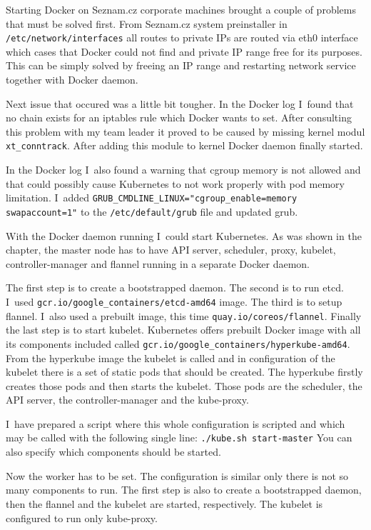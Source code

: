 Starting Docker on Seznam.cz corporate machines brought a couple of problems that must be solved first. From Seznam.cz system preinstaller in \lstinline{/etc/network/interfaces} all routes to private IPs are routed via eth0 interface which cases that Docker could not find and private IP range free for its purposes. This can be simply solved by freeing an IP range and restarting network service together with Docker daemon.

Next issue that occured was a little bit tougher. In the Docker log I~found that no chain exists for an iptables rule which Docker wants to set. After consulting this problem with my team leader it proved to be caused by missing kernel modul \lstinline{xt_conntrack}. After adding this module to kernel Docker daemon finally started.

In the Docker log I~also found a warning that cgroup memory is not allowed and that could possibly cause Kubernetes to not work properly with pod memory limitation. I~added \lstinline{GRUB_CMDLINE_LINUX="cgroup_enable=memory swapaccount=1"} to the \lstinline{/etc/default/grub} file and updated grub.

With the Docker daemon running I~could start Kubernetes. As was shown in the  chapter, the master node has to have API server, scheduler, proxy, kubelet, controller-manager and flannel running in a separate Docker daemon.

The first step is to create a bootstrapped daemon. The second is to run etcd. I~used \lstinline{gcr.io/google_containers/etcd-amd64} image. The third is to setup flannel. I~also used a prebuilt image, this time \lstinline{quay.io/coreos/flannel}. Finally the last step is to start kubelet. Kubernetes offers prebuilt Docker image with all its components included called \lstinline{gcr.io/google_containers/hyperkube-amd64}. From the hyperkube image the kubelet is called and in configuration of the kubelet there is a set of static pods that should be created. The hyperkube firstly creates those pods and then starts the kubelet. Those pods are the scheduler, the API server, the controller-manager and the kube-proxy.

I~have prepared a script where this whole configuration is scripted and which may be called with the following single line: \lstinline{./kube.sh start-master} You can also specify which components should be started.

Now the worker has to be set. The configuration is similar only there is not so many components to run. The first step is also to create a bootstrapped daemon, then the flannel and the kubelet are started, respectively. The kubelet is configured to run only kube-proxy.

